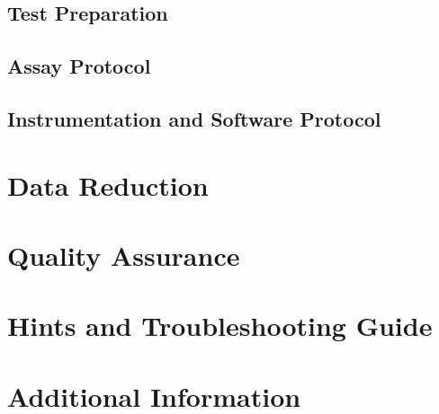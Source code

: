 \subsection{Test Preparation}
\subsection{Assay Protocol}
\subsection{Instrumentation and Software Protocol}

\section{Data Reduction}

\section{Quality Assurance}

\section{Hints and Troubleshooting Guide}

\section{Additional Information}